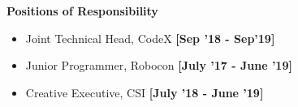 \colorbox{titleColor}{\parbox{7.2in}{\textbf{Positions of Responsibility}}}
\begin{itemize}
    \item Joint Technical Head, CodeX  \hfill {\small{{\textbf{[Sep '18 - Sep'19]}}}\/}      
    
    \item Junior Programmer, Robocon  \hfill {\small{{\textbf{[July '17 - June '19]}}}\/}
    
    \item Creative Executive, CSI  \hfill {\small{{\textbf{[July '18 - June '19]}}}\/}
\end{itemize}